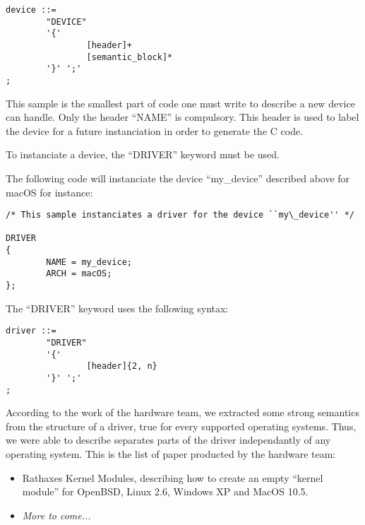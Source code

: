 \documentclass[a4paper,11pt]{report}
\begin{document}
\lstset{language=BNF}
\begin{lstlisting}
device ::=
        "DEVICE"
        '{'
                [header]+
                [semantic_block]*
        '}' ';'
;
\end{lstlisting}




  This sample is the smallest part of code one must write to describe a new
  device \rtx can handle. Only the header ``NAME'' is compulsory. This header
  is used to label the device for a future instanciation in order to generate
  the C code.

  To instanciate a device, the ``DRIVER'' keyword must be used.
  
  The following \rtx code will instanciate the device ``my\_device'' described
  above for macOS for instance:




\lstset{language=rathaxes}
\begin{lstlisting}
/* This sample instanciates a driver for the device ``my\_device'' */

DRIVER
{
        NAME = my_device;
        ARCH = macOS;
};
\end{lstlisting}




  The ``DRIVER'' keyword uses the following syntax:



\lstset{language=BNF}
\begin{lstlisting}
driver ::=
        "DRIVER"
        '{'
                [header]{2, n}
        '}' ';'
;
\end{lstlisting}




  According to the work of the hardware team, we extracted some strong semantics
  from the structure of a driver, true for every supported operating systems.
  Thus, we were able to describe separates parts of the driver independantly of
  any operating system. This is the list of paper producted by the hardware
  team:

    \begin{itemize}
      \item Rathaxes Kernel Modules, describing how to create an empty ``kernel
      module'' for OpenBSD, Linux 2.6, Windows XP and MacOS 10.5.
      \item \textit{More to come...}
    \end{itemize}
\end{document}
